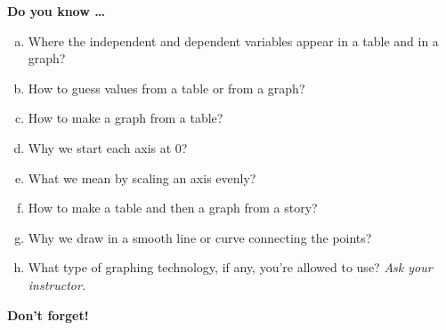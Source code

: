 \newpage



\bigskip

\noindent \textbf{Do you know \ldots} %

\begin{enumerate} [(a)]
\item Where the independent and dependent variables appear in a table and in a graph? 
\item How to guess values from a table or from a graph? 
\item How to make a graph from a table?
\item Why we start each axis at 0? 
\item What we mean by scaling an axis evenly? 
\item How to make a table and then a graph from a story? 
\item Why we draw in a smooth line or curve connecting the points? 
\item What type of graphing technology, if any, you're allowed to use?  \emph{Ask your instructor.}
\end{enumerate}

\bigskip

\noindent \textbf{Don't forget!}
